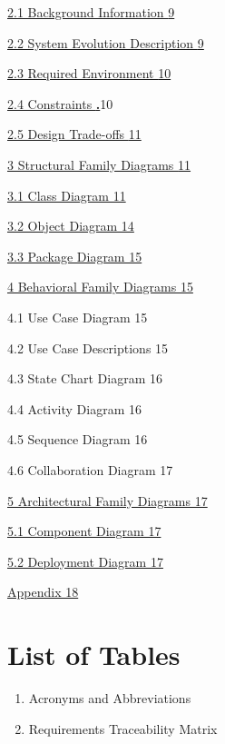 \hyperref[background-information]{2.1 Background Information
\hyperref[background-information]{9}}

\hyperref[system-evolution-description]{2.2 System Evolution Description
\hyperref[system-evolution-description]{9}}

\hyperref[required-environment]{2.3 Required Environment
\hyperref[required-environment]{10}}

\hyperref[Xb309f13310ad76dd529681052fe5315a8c7c065]{2.4 Constraints
\hyperref[Xb309f13310ad76dd529681052fe5315a8c7c065]{\textbf{.}}}10

\hyperref[Xfce2f82cfd63ce3cc56ff7cd87639809d1de288]{2.5 Design
Trade-offs \hyperref[Xfce2f82cfd63ce3cc56ff7cd87639809d1de288]{11}}

\hyperref[structural-family-diagrams]{3 Structural Family Diagrams
\hyperref[structural-family-diagrams]{11}}

\hyperref[X064e3884438d5a452559189fc7e45d065967ef0]{3.1 Class Diagram
11}

\hyperref[X74cee0fdbef85b50ea600fc9189276a3bfcd0e2]{3.2 Object Diagram
14}

\hyperref[X1697ccb2e76750f21357dbfadeb6e81b5e54e78]{3.3 Package Diagram
15}

\hyperref[behavioral-family-diagrams]{4 Behavioral Family Diagrams 15}

4.1 Use Case Diagram 15

4.2 Use Case Descriptions 15

4.3 State Chart Diagram 16

4.4 Activity Diagram 16

4.5 Sequence Diagram 16

4.6 Collaboration Diagram 17

\hyperref[X2415f40c9d0f9e87bdbc628763cbc47606accb8]{5 Architectural
Family Diagrams 17}

\hyperref[X131ff30b2dee961d64957eddfef9aef7e4844bb]{5.1 Component
Diagram 17}

\hyperref[X40e4a2f891c91a91e35c42386e697b8abc32e12]{5.2 Deployment
Diagram 17}

\hyperref[appendix]{Appendix 18}

\section{List of Tables}\label{list-of-tables}

\begin{enumerate}
\def\labelenumi{\arabic{enumi}.}
\item
  Acronyms and Abbreviations
\item
  Requirements Traceability Matrix
\end{enumerate}

